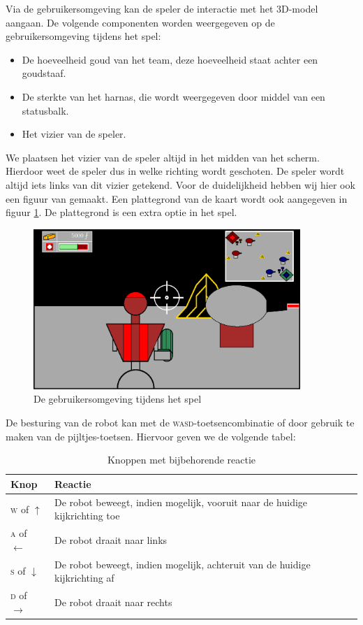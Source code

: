     Via de gebruikersomgeving kan de speler de interactie met het 3D-model aangaan. De volgende componenten worden weergegeven op de gebruikersomgeving tijdens het spel:
    \begin{itemize}
    \item De hoeveelheid goud van het team, deze hoeveelheid staat achter een goudstaaf.
    \item De sterkte van het harnas, die wordt weergegeven door middel van een statusbalk.
    \item Het vizier van de speler.
    \end{itemize}

    We plaatsen het vizier van de speler altijd in het midden van het scherm. Hierdoor weet de speler dus in welke richting wordt geschoten. De speler wordt altijd iets links van dit vizier getekend. Voor de duidelijkheid hebben wij hier ook een figuur van gemaakt. Een plattegrond van de kaart wordt ook aangegeven in figuur \ref{fig:UI}. De plattegrond is een extra optie in het spel.
    \begin{figure}[H]
    \includegraphics[width=0.9\textwidth]{../Graphics/UI.eps}
    \caption{De gebruikersomgeving tijdens het spel}
    \label{fig:UI}
    \end{figure}
    De besturing van de robot kan met de \textsc{wasd}-toetsencombinatie of door gebruik te maken van de pijltjes-toetsen. Hiervoor geven we de volgende tabel:
    \begin{table}[H]
        \small
        \centering
        \begin{tabular}{| l | l |}
        \hline
        Knop & Reactie \\ \hline
        \textsc{w} of $\uparrow$ & De robot beweegt, indien mogelijk, vooruit naar de huidige kijkrichting toe \\ \hline
        \textsc{a} of $\leftarrow$ & De robot draait naar links \\ \hline
        \textsc{s} of $\downarrow$ & De robot beweegt, indien mogelijk, achteruit van de huidige kijkrichting af \\ \hline
        \textsc{d} of $\rightarrow$ & De robot draait naar rechts \\ \hline
        \end{tabular}
        \caption{Knoppen met bijbehorende reactie}
        \label{tab:planning}
    \end{table}

